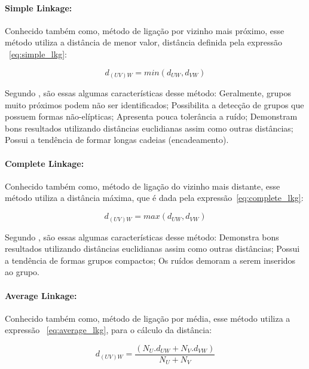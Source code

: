 \paragraph{Simple Linkage:} 

Conhecido também como, método de ligação por vizinho mais próximo, esse método utiliza a distância de menor valor, distância definida pela expressão ~\ref{eq:simple_lkg}: 

\begin{equation}\label{eq:simple_lkg}
d_{(UV)W} = min(d_{UW},d_{VW})
\end{equation}

Segundo \cite{anderberg1973}, são essas algumas características desse método: Geralmente, grupos muito próximos podem não ser identificados; Possibilita a detecção de grupos que possuem formas não-elípticas; Apresenta pouca tolerância a ruído; Demonstram bons resultados utilizando distâncias euclidianas assim como outras distâncias; Possui a tendência de formar longas cadeias (encadeamento).

\paragraph{Complete Linkage:}

Conhecido também como, método de ligação do vizinho mais distante, esse método utiliza a distância máxima, que é dada pela expressão~\ref{eq:complete_lkg}:

\begin{equation}\label{eq:complete_lkg}
d_{(UV)W} = max(d_{UW},d_{VW})
\end{equation}

Segundo \cite{kaufman1990finding}, são essas algumas características desse método: Demonstra bons resultados utilizando distâncias euclidianas assim como outras distâncias; Possui a tendência de formas grupos compactos; Os ruídos demoram a serem inseridos ao grupo.

\paragraph{Average Linkage:}

Conhecido também como, método de ligação por média, esse método utiliza a expressão ~\ref{eq:average_lkg}, para o cálculo da distância:

\begin{equation}\label{eq:average_lkg}
d_{(UV)W} = \frac{(N_{U}.d_{UW} + N_{V}.d_{VW})}{N_{U}+N_{V}}
\end{equation}

